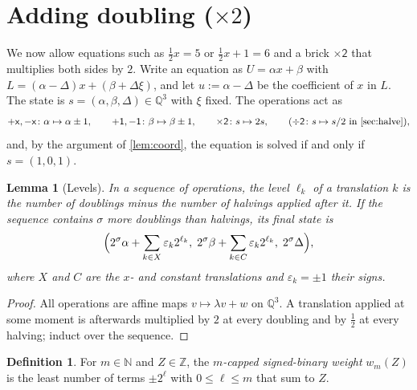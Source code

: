 \documentclass[11pt,a4paper]{article}
\newtheorem{lemma}[theorem]{Lemma}
\theoremstyle{definition}
\newtheorem{definition}[theorem]{Definition}
\theoremstyle{remark}
\newcommand{\N}{\mathbb{N}}
\newcommand{\Z}{\mathbb{Z}}
\newcommand{\Q}{\mathbb{Q}}
\newcommand{\pX}{\ensuremath{\mathord{+}\mathsf{x}}}
\newcommand{\mX}{\ensuremath{\mathord{-}\mathsf{x}}}
\newcommand{\pU}{\ensuremath{\mathord{+}\mathsf{1}}}
\newcommand{\mU}{\ensuremath{\mathord{-}\mathsf{1}}}
\newcommand{\dbl}{\ensuremath{\mathord{\times}\mathsf{2}}}
\newcommand{\hlv}{\ensuremath{\mathord{\div}\mathsf{2}}}
\begin{document}
\section{Adding doubling (\texorpdfstring{$\times2$}{x2})}\label{sec:double}

We now allow equations such as $\frac12x=5$ or $\frac12x+1=6$ and a brick $\dbl$ that
multiplies both sides by $2$. Write an equation as $U=\alpha x+\beta$ with
$L=(\alpha-\Delta)x+(\beta+\Delta\xi)$, and let $u:=\alpha-\Delta$ be the coefficient of
$x$ in $L$. The state is $s=(\alpha,\beta,\Delta)\in\Q^3$ with $\xi$ fixed. The
operations act as
\[
\pX,\mX\colon\alpha\mapsto\alpha\pm1,\qquad
\pU,\mU\colon\beta\mapsto\beta\pm1,\qquad
\dbl\colon s\mapsto2s,\qquad(\hlv\colon s\mapsto s/2\text{ in \cref{sec:halve}}),
\]
and, by the argument of \cref{lem:coord}, the equation is solved if and only if
$s=(1,0,1)$.

\begin{lemma}[Levels]\label{lem:levels}
In a sequence of operations, the \emph{level} $\ell_k$ of a translation $k$ is the number
of doublings minus the number of halvings applied after it. If the sequence contains
$\sigma$ more doublings than halvings, its final state is
\[
\Bigl(2^\sigma\alpha+\sum_{k\in X}\varepsilon_k2^{\ell_k},\;
2^\sigma\beta+\sum_{k\in C}\varepsilon_k2^{\ell_k},\;2^\sigma\Delta\Bigr),
\]
where $X$ and $C$ are the $x$- and constant translations and $\varepsilon_k=\pm1$ their
signs.
\end{lemma}
\begin{proof}
All operations are affine maps $v\mapsto\lambda v+w$ on $\Q^3$. A translation applied at
some moment is afterwards multiplied by $2$ at every doubling and by $\frac12$ at every
halving; induct over the sequence.
\end{proof}

\begin{definition}
For $m\in\N$ and $Z\in\Z$, the \emph{$m$-capped signed-binary weight} $w_m(Z)$ is the least
number of terms $\pm2^\ell$ with $0\le\ell\le m$ that sum to $Z$.
\end{definition}
\end{document}
